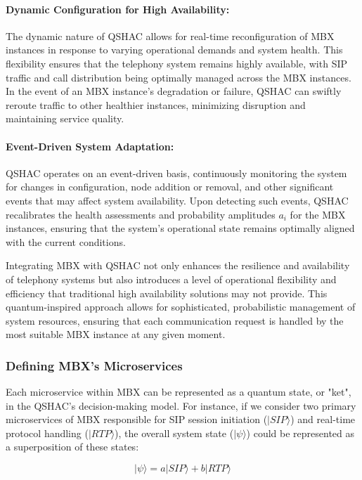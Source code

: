 \documentclass[12pt]{article}
\begin{document}
\paragraph{Dynamic Configuration for High Availability:} The dynamic nature of QSHAC allows for real-time reconfiguration of MBX instances in response to varying operational demands and system health. This flexibility ensures that the telephony system remains highly available, with SIP traffic and call distribution being optimally managed across the MBX instances. In the event of an MBX instance's degradation or failure, QSHAC can swiftly reroute traffic to other healthier instances, minimizing disruption and maintaining service quality.

\paragraph{Event-Driven System Adaptation:} QSHAC operates on an event-driven basis, continuously monitoring the system for changes in configuration, node addition or removal, and other significant events that may affect system availability. Upon detecting such events, QSHAC recalibrates the health assessments and probability amplitudes \(a_i\) for the MBX instances, ensuring that the system's operational state remains optimally aligned with the current conditions.

Integrating MBX with QSHAC not only enhances the resilience and availability of telephony systems but also introduces a level of operational flexibility and efficiency that traditional high availability solutions may not provide. This quantum-inspired approach allows for sophisticated, probabilistic management of system resources, ensuring that each communication request is handled by the most suitable MBX instance at any given moment.


\subsubsection{Defining MBX's Microservices}

Each microservice within MBX can be represented as a quantum state, or "ket", in the QSHAC's decision-making model. For instance, if we consider two primary microservices of MBX responsible for SIP session initiation (\(|SIP\rangle\)) and real-time protocol handling (\(|RTP\rangle\)), the overall system state (\(|\psi\rangle\)) could be represented as a superposition of these states:

\[|\psi\rangle = a|SIP\rangle + b|RTP\rangle\]
\end{document}
